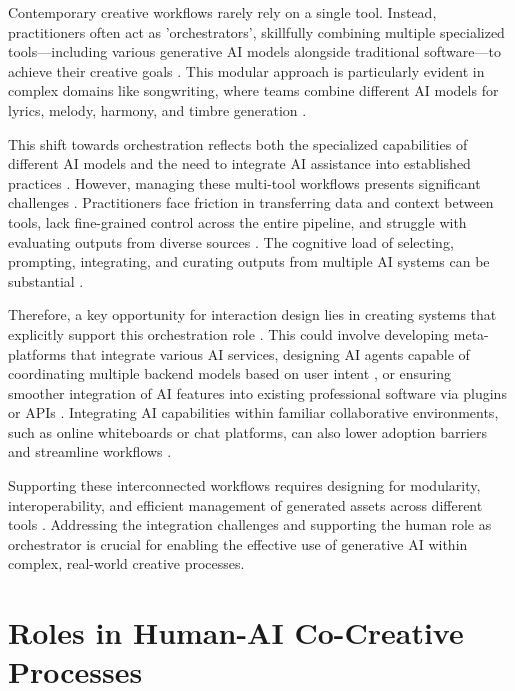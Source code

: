 Contemporary creative workflows rarely rely on a single tool. Instead, practitioners often act as 'orchestrators', skillfully combining multiple specialized tools—including various generative AI models alongside traditional software—to achieve their creative goals \citep{Palani2024-on}. This modular approach is particularly evident in complex domains like songwriting, where teams combine different AI models for lyrics, melody, harmony, and timbre generation \citep{Huang2020-fh, Uitdenbogerd2023-no}.

This shift towards orchestration reflects both the specialized capabilities of different AI models and the need to integrate AI assistance into established practices \citep{Palani2024-on, Park2024-gw}. However, managing these multi-tool workflows presents significant challenges \citep{Huang2020-fh, Palani2024-on}. Practitioners face friction in transferring data and context between tools, lack fine-grained control across the entire pipeline, and struggle with evaluating outputs from diverse sources \citep{Palani2024-on}. The cognitive load of selecting, prompting, integrating, and curating outputs from multiple AI systems can be substantial \citep{Huang2020-fh, Uitdenbogerd2023-no}.

Therefore, a key opportunity for interaction design lies in creating systems that explicitly support this orchestration role \citep{Palani2024-on}. This could involve developing meta-platforms that integrate various AI services, designing AI agents capable of coordinating multiple backend models based on user intent \citep{Zhang2021-ej, Gottweis2025-kc}, or ensuring smoother integration of AI features into existing professional software via plugins or APIs \citep{Park2024-gw, Huang2020-fh}. Integrating AI capabilities within familiar collaborative environments, such as online whiteboards or chat platforms, can also lower adoption barriers and streamline workflows \citep{Verheijden2023-gn}.

Supporting these interconnected workflows requires designing for modularity, interoperability, and efficient management of generated assets across different tools \citep{Huang2020-fh, Palani2024-on}. Addressing the integration challenges and supporting the human role as orchestrator is crucial for enabling the effective use of generative AI within complex, real-world creative processes.


\section{Roles in Human-AI Co-Creative Processes}


